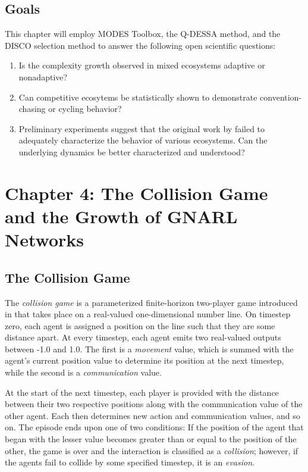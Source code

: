 \documentclass{article}
\begin{document}
\subsection*{Goals}
This chapter will employ MODES Toolbox, the Q-DESSA method, and the DISCO selection method to
answer the following open scientific questions:
\begin{enumerate}
    \item Is the complexity growth observed in mixed ecosystems adaptive or nonadaptive?
    \item Can competitive ecosytems be statistically shown to demonstrate convention-chasing 
        or cycling behavior?
    \item Preliminary experiments suggest that the original work by \citet{moran2019evolving}
        failed to adequately characterize the behavior of various ecosystems. Can the 
        underlying dynamics be better characterized and understood?
\end{enumerate}

\section*{Chapter 4: The Collision Game and the Growth of GNARL Networks}
\subsection*{The Collision Game}
The \textit{collision game} is a parameterized finite-horizon two-player game introduced in 
\citet{willkens2022} that takes place on a real-valued one-dimensional number line. On 
timestep zero, each agent is assigned a position on the line such that they are some distance 
apart. At every timestep, each agent emits two real-valued outputs between -1.0 and 1.0.
The first is a \textit{movement} value, which is summed with the agent's current position value 
to determine its position at the next timestep, while the second is a \textit{communication} value. 

At the start of the next timestep, each player is provided with the distance between their two 
respective positions along with the communication value of the other agent. Each then determines 
new action and communication values, and so on. The episode ends upon one of two conditions: If 
the position of the agent that began with the lesser value becomes greater than or equal to the 
position of the other, the game is over and the interaction is classified as a \textit{collision}; 
however, if the agents fail to collide by some specified timestep, it is an \textit{evasion}. 
\end{document}

